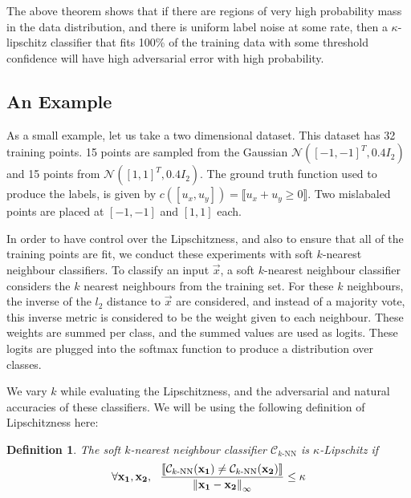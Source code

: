 \documentclass{ociamthesis}
\newtheorem{definition}{Definition}
\begin{document}
The above theorem shows that if there are regions of very high probability mass
in the data distribution, and there is uniform label noise at some rate, then a
$\kappa$-lipschitz classifier that fits 100\% of the training data with some
threshold confidence will have high adversarial error with high probability.

\subsection*{An Example}
As a small example, let us take a two dimensional dataset. This dataset has 32
training points. 15 points are sampled from the Gaussian $\mathcal{N}([-1,
-1]^T, 0.4I_2)$ and 15 points from $\mathcal{N}([1, 1]^T, 0.4I_2)$. The ground
truth function used to produce the labels, is given by $c([u_x, u_y]) =
\llbracket u_x+u_y \geq 0 \rrbracket$. Two mislabaled points are placed at $[-1,
-1]$ and $[1, 1]$ each.

In order to have control over the Lipschitzness, and also to ensure that all of
the training points are fit, we conduct these experiments with soft $k$-nearest
neighbour classifiers. To classify an input $\vec{x}$, a soft $k$-nearest
neighbour classifier considers the $k$ nearest neighbours from the training set.
For these $k$ neighbours, the inverse of the $l_2$ distance to $\vec{x}$ are
considered, and instead of a majority vote, this inverse metric is considered to
be the weight given to each neighbour. These weights are summed per class, and
the summed values are used as logits. These logits are plugged into the softmax
function to produce a distribution over classes.

We vary $k$ while evaluating the Lipschitzness, and the adversarial and natural
accuracies of these classifiers. We will be using the following definition of
Lipschitzness here:
\begin{definition}
    The soft $k$-nearest neighbour classifier $\mathcal{C}_{k\text{-NN}}$ is
    $\kappa$-Lipschitz if
    \begin{equation*}
        \forall {\mathbf{x_1}}, {\mathbf{x_2}},~~
        \frac{\llbracket 
            \mathcal{C}_{k\text{-NN}}({\mathbf{x_1}}) \neq \mathcal{C}_{k\text{-NN}}({\mathbf{x_2}})
        \rrbracket}{\mathrm{\left\lVert{\mathbf{x_1}} - {\mathbf{x_2}}\right\rVert}_\infty}
        \leq \kappa
    \end{equation*}
\end{definition}
\end{document}
